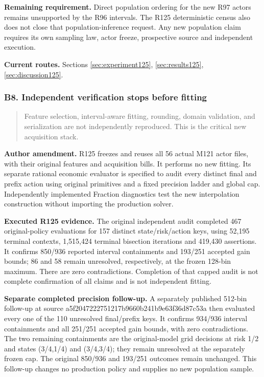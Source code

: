 \noindent\textbf{Remaining requirement.} Direct population ordering for the new R97 actors remains unsupported by the R96 intervals. The R125 deterministic census also does not close that population-inference request. Any new population claim requires its own sampling law, actor freeze, prospective source and independent execution.

\noindent\textbf{Current routes.} Sections \ref{sec:experiment125}, \ref{sec:results125}, \ref{sec:discussion125}.

\subsubsection{B8. Independent verification stops before fitting}

\begin{quote}\small
Feature selection, interval-aware fitting, rounding, domain validation, and serialization are not independently reproduced. This is the critical new acquisition stack.
\end{quote}

\noindent\textbf{Author amendment.} R125 freezes and reuses all 56 actual M121 actor files, with their original features and acquisition bills. It performs no new fitting. Its separate rational economic evaluator is specified to audit every distinct final and prefix action using original primitives and a fixed precision ladder and global cap. Independently implemented Fraction diagnostics test the new interpolation construction without importing the production solver.

\noindent\textbf{Executed R125 evidence.} The original independent audit completed 467 original-policy evaluations for 157 distinct state/risk/action keys, using 52,195 terminal contexts, 1,515,424 terminal bisection iterations and 419,430 assertions. It confirms 850/936 reported interval containments and 193/251 accepted gain bounds; 86 and 58 remain unresolved, respectively, at the frozen 128-bin maximum. There are zero contradictions. Completion of that capped audit is not complete confirmation of all claims and is not independent fitting.

\noindent\textbf{Separate completed precision follow-up.} A separately published 512-bin follow-up at source a5f2047222751217b9660b241b9e63f36d87c53a then evaluated every one of the 110 unresolved final/prefix keys. It confirms 934/936 interval containments and all 251/251 accepted gain bounds, with zero contradictions. The two remaining containments are the original-model grid decisions at risk 1/2 and states (3/4,1/4) and (3/4,3/4); they remain unresolved at the separately frozen cap. The original 850/936 and 193/251 outcomes remain unchanged. This follow-up changes no production policy and supplies no new population sample.

